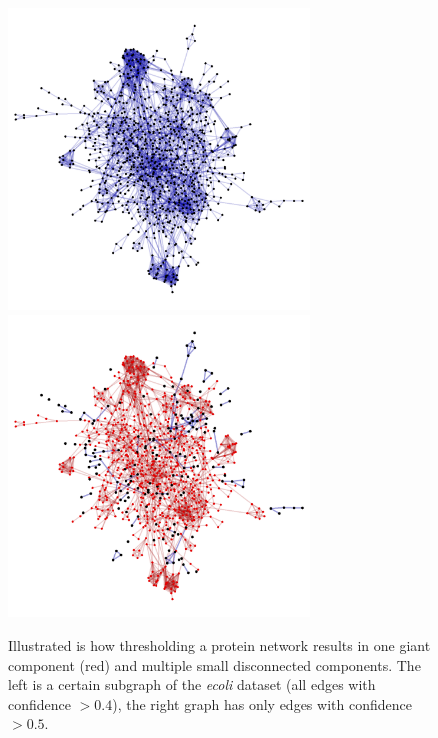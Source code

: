 \begin{figure}
\includegraphics[height=8cm]{disconnecting_graph.png}\includegraphics[height=8cm]{disconnecting_graph2.png}
\caption{Illustrated is how thresholding a protein network results in one giant component (red) and multiple small disconnected components.
The left is a certain subgraph of the \textit{ecoli} dataset (all edges with confidence $>0.4$), the right graph has only edges with confidence $>0.5$.}
\label{fig:disconnecting_graph}
\end{figure}
